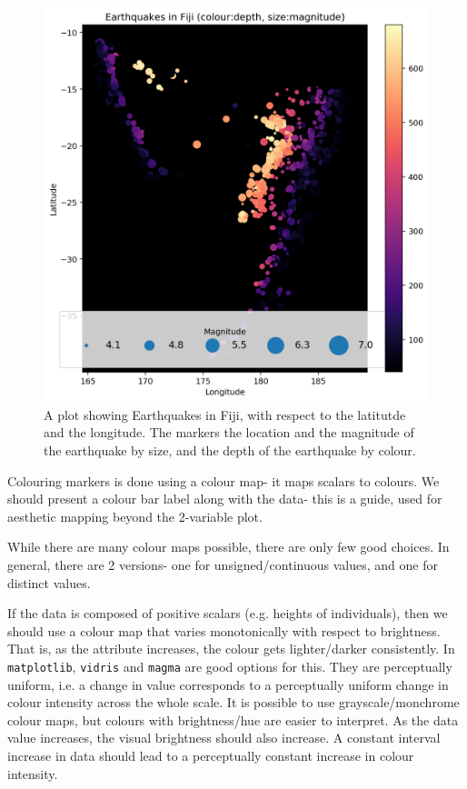 \documentclass[a4paper, openany]{memoir}
\begin{document}
\begin{figure}[H]
    \centering
    \includegraphics[scale=0.45]{src/2.42 Fiji Example Plot 3.png}
    \caption{A plot showing Earthquakes in Fiji, with respect to the latitutde and the longitude. The markers the location and the magnitude of the earthquake by size, and the depth of the earthquake by colour.}
\end{figure}

Colouring markers is done using a colour map- it maps scalars to colours. We should present a colour bar label along with the data- this is a guide, used for aesthetic mapping beyond the 2-variable plot.

While there are many colour maps possible, there are only few good choices. In general, there are 2 versions- one for unsigned/continuous values, and one for distinct values.

If the data is composed of positive scalars (e.g. heights of individuals), then we should use a colour map that varies monotonically with respect to brightness. That is, as the attribute increases, the colour gets lighter/darker consistently. In \texttt{matplotlib}, \texttt{vidris} and \texttt{magma} are good options for this. They are perceptually uniform, i.e. a change in value corresponds to a perceptually uniform change in colour intensity across the whole scale. It is possible to use grayscale/monchrome colour maps, but colours with brightness/hue are easier to interpret. As the data value increases, the visual brightness should also increase. A constant interval increase in data should lead to a perceptually constant increase in colour intensity.
\end{document}

